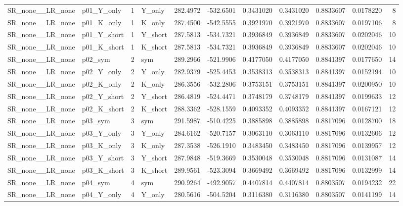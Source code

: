 \begin{table}[!h]
\begin{tabular}[t]{llrlrrrrrrr}
SR\_none\_\_LR\_none & p01\_Y\_only & 1 & Y\_only & 282.4972 & -532.6501 & 0.3431020 & 0.3431020 & 0.8833607 & 0.0178220 & 8\\
SR\_none\_\_LR\_none & p01\_K\_only & 1 & K\_only & 287.4500 & -542.5555 & 0.3921970 & 0.3921970 & 0.8833607 & 0.0197106 & 8\\
SR\_none\_\_LR\_none & p01\_Y\_short & 1 & Y\_short & 287.5813 & -534.7321 & 0.3936849 & 0.3936849 & 0.8833607 & 0.0202046 & 10\\
SR\_none\_\_LR\_none & p01\_K\_short & 1 & K\_short & 287.5813 & -534.7321 & 0.3936849 & 0.3936849 & 0.8833607 & 0.0202046 & 10\\
\addlinespace
SR\_none\_\_LR\_none & p02\_sym & 2 & sym & 289.2966 & -521.9906 & 0.4177050 & 0.4177050 & 0.8841397 & 0.0177650 & 14\\
SR\_none\_\_LR\_none & p02\_Y\_only & 2 & Y\_only & 282.9379 & -525.4453 & 0.3538313 & 0.3538313 & 0.8841397 & 0.0152194 & 10\\
SR\_none\_\_LR\_none & p02\_K\_only & 2 & K\_only & 286.3556 & -532.2806 & 0.3753151 & 0.3753151 & 0.8841397 & 0.0200950 & 10\\
SR\_none\_\_LR\_none & p02\_Y\_short & 2 & Y\_short & 286.4819 & -524.4471 & 0.3748179 & 0.3748179 & 0.8841397 & 0.0199633 & 12\\
SR\_none\_\_LR\_none & p02\_K\_short & 2 & K\_short & 288.3362 & -528.1559 & 0.4093352 & 0.4093352 & 0.8841397 & 0.0167121 & 12\\
\addlinespace
SR\_none\_\_LR\_none & p03\_sym & 3 & sym & 291.5987 & -510.4225 & 0.3885898 & 0.3885898 & 0.8817096 & 0.0128700 & 18\\
SR\_none\_\_LR\_none & p03\_Y\_only & 3 & Y\_only & 284.6162 & -520.7157 & 0.3063110 & 0.3063110 & 0.8817096 & 0.0132606 & 12\\
SR\_none\_\_LR\_none & p03\_K\_only & 3 & K\_only & 287.3538 & -526.1910 & 0.3483450 & 0.3483450 & 0.8817096 & 0.0139957 & 12\\
SR\_none\_\_LR\_none & p03\_Y\_short & 3 & Y\_short & 287.9848 & -519.3669 & 0.3530048 & 0.3530048 & 0.8817096 & 0.0131087 & 14\\
SR\_none\_\_LR\_none & p03\_K\_short & 3 & K\_short & 289.9561 & -523.3094 & 0.3669492 & 0.3669492 & 0.8817096 & 0.0132999 & 14\\
\addlinespace
SR\_none\_\_LR\_none & p04\_sym & 4 & sym & 290.9264 & -492.9057 & 0.4407814 & 0.4407814 & 0.8803507 & 0.0194232 & 22\\
SR\_none\_\_LR\_none & p04\_Y\_only & 4 & Y\_only & 280.5616 & -504.5204 & 0.3116380 & 0.3116380 & 0.8803507 & 0.0141199 & 14\\

\end{tabular}
\end{table}
